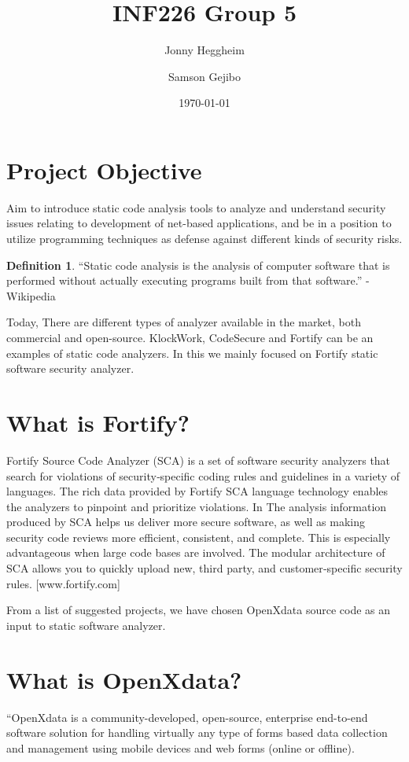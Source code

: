 \documentclass[11pt,a4paper]{article}
\title{INF226 Group 5}
\author{Jonny Heggheim \and Samson Gejibo}
\date{\today}
\theoremstyle{definition}
\newtheorem*{defn}{Definition}
\begin{document}
\maketitle
\tableofcontents
\newpage

\section{Project Objective}
Aim to introduce static code analysis tools to analyze and understand security
issues relating to development of net-based applications, and be in a position
to utilize programming techniques as defense against different kinds of
security risks.

\begin{defn}
``Static code analysis is the analysis of computer software that is performed
without actually executing programs built from that software.''  - Wikipedia
\end{defn}
Today, There are different types of analyzer available in the market,
both commercial and open-source. KlockWork, CodeSecure and Fortify can be an
examples of static code analyzers.
In this we mainly focused on Fortify static software security analyzer.


\section{What is Fortify?}
Fortify Source Code Analyzer (SCA) is a set of software security analyzers
that search for violations of security‐specific coding rules and guidelines in
a variety of languages. The rich data provided by Fortify SCA language
technology enables the analyzers to pinpoint and prioritize violations.
In The analysis information produced by SCA helps us deliver more secure
software, as well as making security code reviews more efficient, consistent,
and complete. This is especially advantageous when large code bases are
involved. The modular architecture of SCA allows you to quickly upload new,
third party, and customer‐specific security rules. [www.fortify.com]

From a list of suggested projects, we have chosen OpenXdata source code as an
input to static software analyzer.


\section{What is OpenXdata?}
“OpenXdata is a community-developed, open-source, enterprise end-to-end
software solution for handling virtually any type of forms based data
collection and management using mobile devices and web forms
(online or offline).
\end{document}
